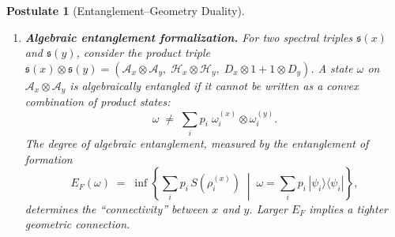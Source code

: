 \documentclass[12pt,a4paper]{article}
\theoremstyle{postulate}
\newtheorem{postulate}{Postulate}
\newcommand{\Hil}{\mathcal{H}}
\newcommand{\Alg}{\mathcal{A}}
\newcommand{\Dirac}{D}
\begin{document}
\begin{postulate}[Entanglement--Geometry Duality]
\begin{enumerate}[label=\textbf{(\Alph*)}]
In the semiclassical limit, the entropic distance must reduce to the
Connes distance \eqref{eq:connes-distance}:
\begin{equation}\label{eq:entropic-connes}
  d_{\mathrm{ent}}(x, y) \;\xrightarrow{\;\hbar \to 0\;}
  \; d_{\mathrm{Connes}}(p, q),
\end{equation}
where $p, q$ are the continuum points corresponding to $x, y$.

\item \textbf{Algebraic entanglement formalization.}\quad
For two spectral triples $\mathfrak{s}(x)$ and $\mathfrak{s}(y)$, consider
the product triple
$\mathfrak{s}(x) \otimes \mathfrak{s}(y) = (\Alg_x \otimes \Alg_y,\;
\Hil_x \otimes \Hil_y,\; \Dirac_x \otimes 1 + 1 \otimes \Dirac_y)$.
A state $\omega$ on $\Alg_x \otimes \Alg_y$ is
\emph{algebraically entangled} if it cannot be written as a convex
combination of product states:
\begin{equation}\label{eq:algebraic-ent}
  \omega \;\neq\; \sum_i p_i\;\omega_i^{(x)} \otimes \omega_i^{(y)}.
\end{equation}
The degree of algebraic entanglement, measured by the
\emph{entanglement of formation}
\begin{equation}\label{eq:EoF}
  E_F(\omega) \;=\; \inf\left\{\sum_i p_i\, S(\rho_i^{(x)})
  \;\middle|\; \omega = \sum_i p_i\, |\psi_i\rangle\langle\psi_i|
  \right\},
\end{equation}
determines the ``connectivity'' between $x$ and $y$.  Larger $E_F$
implies a tighter geometric connection.
\end{enumerate}
\end{postulate}
\end{document}
